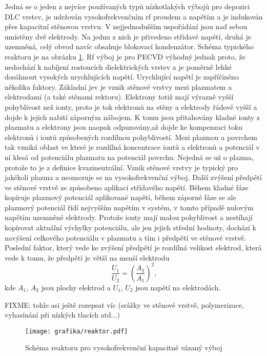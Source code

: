 Jedná se o jeden z nejvíce používaných typů nízkotlakých výbojů pro depozici DLC vrstev, je udržován vysokofrekvenčním rf proudem a napětím a je indukován přes kapacitní stěnovou vrstvu. V nejjednodušším uspořádání jsou nad sebou umístěny dvě elektrody. Na jednu z nich je přivedeno střídavé napětí, druhá je uzemněná, celý obvod navíc obsahuje blokovací kondenzátor. Schéma typického reaktoru je na obrázku \ref{reaktor-schema}. Rf výboj je pro PECVD výhodný jednak proto, že nedochází k nabíjení rostoucích dielektrických vrstev a je poměrně lehké dosáhnout vysokých urychlujících napětí. Urychlující napětí je zapříčiněno několika faktory. Základní jev je vznik stěnové vrstvy mezi plazmatem a elektrodami (a také stěnami rektoru). 
Elektrony totiž mají výrazně vyšší pohyblivost než ionty, proto je tok elektronů na stěny a elektrody řádově vyšší a dojde k jejich nabití záporným nábojem. K tomu jsou přitahovány kladné ionty z plazmatu a elektrony jsou naopak odpuzovány,až dojde ke kompenzaci toku elektronů i iontů způsobených rozdílnou pohyblivostí. Mezi plazmou a povrchem tak vzniká oblast ve které je rozdílná koncentrace iontů a elektronů a potenciál v ní klesá od potenciálu plazmatu na potenciál povrchu. Nejedná se už o plazma, protože to je z definice kvazineutrální. 
Vznik stěnové vrstvy je typický pro jakékoli plazma a neomezuje se na vysokofrekvenční výboj. Další zvýšení předpětí ve stěnové vrstvě ze způsobeno aplikací střídavého napětí. Během kladné fáze kopíruje plazmový potenciál aplikované napětí, během záporné fáze se ale plazmový potenciál řídí nejvyšším napětím v systém, v tomto případě nulovým napětím uzemněné elektrody. Protože ionty mají malou pohyblivost a nestíhají kopírovat aktuální výchylky potenciálu, ale jen jejich střední hodnoty, dochází k navýšení celkového potenciálu v plazmatu a tím i předpětí ve stěnové vrstvě.  
Poslední faktor, který vede ke zvýšení předpětí je rozdílná velikost elektrod, která vede k tomu, že předpětí je větší na menší elektrodu \cite{liebermandischarge, chen2003sheet}
\begin{equation}
\frac{U_1}{U_2} = \left(\frac{A_2}{A_1}\right)^2 \text{,}
\end{equation}
kde $A_1$, $A_2$ jsou plochy elektrod a $U_1$, $U_2$ jsou napětí na elektrodách.

FIXME: tohle asi ještě rozepsat víc (srážky ve stěnové vrstvě, polymerizace, vyhasínání při nízkých tlacích atd...)

\begin{figure}[htbp]
  \centering
  \texttt{[image: grafika/reaktor.pdf]}
  \caption{Schéma reaktoru pro vysokofrekvenční kapacitně vázaný výboj}
  \label{reaktor-schema}
\end{figure}

\cleardoublepage
